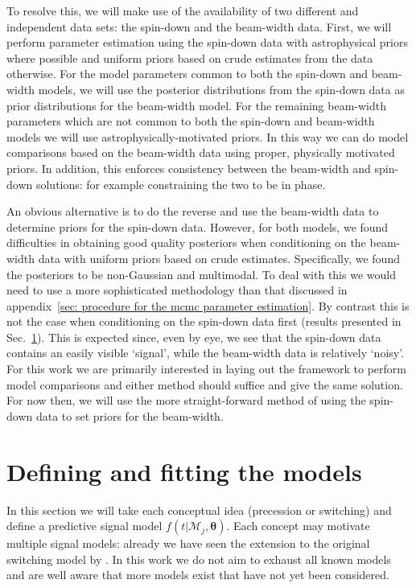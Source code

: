 \documentclass[../full_thesis/full_thesis.tex]{subfiles}
\newcommand{\M}{\mathcal{M}}
\newcommand{\params}{\boldsymbol{\theta}}
\begin{document}
To resolve this, we will make use of the availability of two different and
independent data sets: the spin-down and the beam-width data.  First, we will
perform parameter estimation using the spin-down data with astrophysical priors
where possible and uniform priors based on crude estimates from the data
otherwise. For the model parameters common to both the spin-down and
beam-width models, we will use the posterior distributions from the spin-down
data as prior distributions for the beam-width model. For the remaining
beam-width parameters which are not common to both the spin-down and beam-width
models we will use astrophysically-motivated priors. In this way we can do
model comparisons based on the beam-width data using proper, physically
motivated priors. In addition, this enforces consistency between the beam-width
and spin-down solutions: for example constraining the two to be in phase.

An obvious alternative is to do the reverse and use the beam-width data to
determine priors for the spin-down data. However, for both models, we found
difficulties in obtaining good quality posteriors when conditioning on the
beam-width data with uniform priors based on crude estimates.
Specifically, we found the posteriors to be non-Gaussian and multimodal.
To deal with this we would
need to use a more sophisticated methodology than that discussed in
appendix~\ref{sec: procedure for the mcmc parameter estimation}. By contrast this
is not the case when conditioning on the spin-down data first (results
presented in Sec.~\ref{sec: defining and fitting the models}). This is expected
since, even by eye, we see that the spin-down data contains an easily visible
`signal', while the beam-width data is relatively `noisy'.  For this work we
are primarily interested in laying out the framework to perform model
comparisons and either method should suffice and give the same solution.  For
now then, we will use the more straight-forward method of using the spin-down
data to set priors for the beam-width.



\section{Defining and fitting the models}
\label{sec: defining and fitting the models}
In this section we will take each conceptual idea (precession or switching) and
define a predictive signal model $f(t|\M_j, \params)$. Each concept may motivate
multiple signal models: already we have seen the extension to the original
\citet{Lyne2010} switching model by \citet{Perera2015}. In this work we do not
aim to exhaust all known models and are well aware that more models exist that
have not yet been considered.
\end{document}
